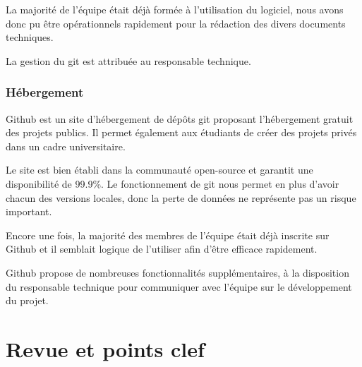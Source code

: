 \documentclass{../../res/univ-projet}
\begin{document}
	La majorité de l'équipe était déjà formée à l'utilisation du logiciel, nous avons donc pu être opérationnels rapidement pour la rédaction des divers documents techniques.

	La gestion du git est attribuée au responsable technique.

\subsubsection{Hébergement}
	Github est un site d'hébergement de dépôts git proposant l'hébergement gratuit des projets publics. Il permet également aux étudiants de créer des projets privés dans un cadre universitaire.

	Le site est bien établi dans la communauté open-source et garantit une disponibilité de 99.9\%. Le fonctionnement de git nous permet en plus d'avoir chacun des versions locales, donc la perte de données ne représente pas un risque important.

	Encore une fois, la majorité des membres de l'équipe était déjà inscrite sur Github et il semblait logique de l'utiliser afin d'être efficace rapidement. 

	Github propose de nombreuses fonctionnalités supplémentaires, à la disposition du responsable technique pour communiquer avec l'équipe sur le développement du projet.

\newpage
\section{Revue et points clef}
\end{document}
